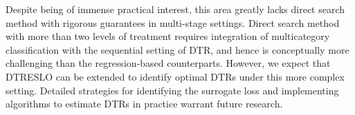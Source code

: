 \documentclass[preprint] {imsart}
\begin{document}
  
  Despite being of immense practical interest, this area greatly lacks direct search method with rigorous guarantees in multi-stage settings. Direct search method with more than two levels of treatment requires integration of multicategory classification with the sequential setting of DTR, and hence is conceptually more challenging than the regression-based counterparts. However, we expect that DTRESLO can be extended to identify optimal DTRs under this more complex setting. 
  Detailed strategies for identifying the surrogate loss and implementing algorithms to estimate DTRs in practice warrant future research. 
  
  
  
 
\end{document}
